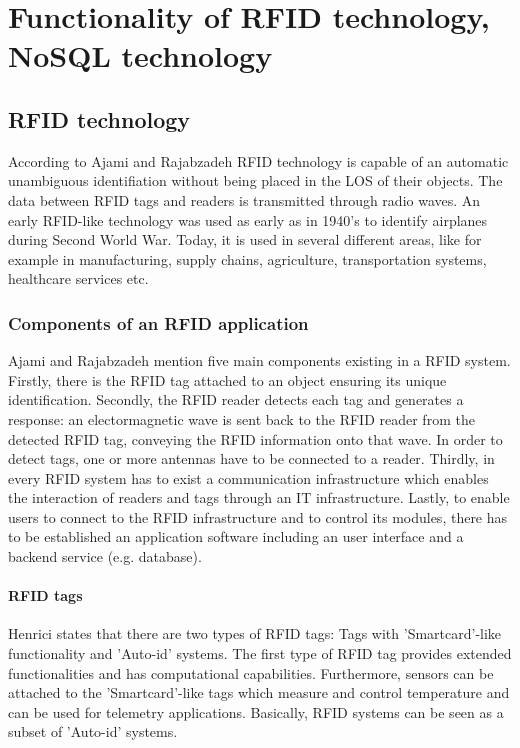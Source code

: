 \chapter{Functionality of RFID technology, NoSQL technology}
\label{Kap2}

\section{RFID technology}

According to Ajami and Rajabzadeh \cite{ncbi} RFID technology is capable of an automatic unambiguous identifiation without being placed in the \ac{LOS} of their objects. The data between RFID tags and readers is transmitted through radio waves. An early RFID-like technology was used as early as in 1940's to identify airplanes during Second World War. Today, it is used in several different areas, like for example in manufacturing, supply chains, agriculture, transportation systems, healthcare services etc. 

\subsection{Components of an RFID application} 

Ajami and Rajabzadeh \cite{ncbi} mention five main components existing in a RFID system. Firstly, there is the RFID tag attached to an object ensuring its unique identification. Secondly, the RFID reader detects each tag and generates a response: an electormagnetic wave is sent back to the RFID reader from the detected RFID tag, conveying the RFID information onto that wave. In order to detect tags, one or more antennas have to be connected to a reader. Thirdly, in every RFID system has to exist a communication infrastructure which enables the interaction of readers and tags through an \ac{IT} infrastructure. Lastly, to enable users to connect to the RFID infrastructure and to control its modules, there has to be established an application software including an user interface and a backend service (e.g. database).

\subsubsection{RFID tags} \label{tag}

Henrici \cite{henrici} states that there are two types of RFID tags: Tags with 'Smartcard'-like functionality and 'Auto-id' systems. The first type of RFID tag provides extended functionalities and has computational capabilities. Furthermore, sensors can be attached to the 'Smartcard'-like tags which measure and control temperature and can be used for telemetry applications. Basically, RFID systems can be seen as a subset of 'Auto-id' systems.

